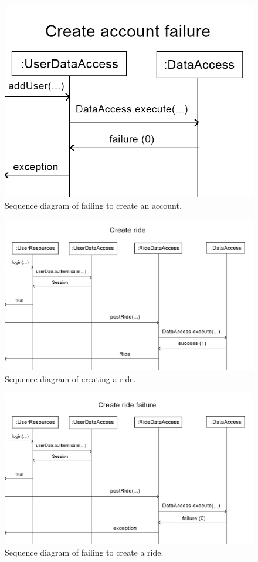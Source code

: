 \documentclass{article}
\begin{document}
\begin{figure}[h]
  \centering
  \includegraphics[scale=0.3]{seqdiagram5.png}
  \caption{Sequence diagram of failing to create an account.}
  \label{fig:seq5}
\end{figure}

\begin{figure}[h]
  \centering
  \includegraphics[scale=0.3]{seqdiagram6.png}
  \caption{Sequence diagram of creating a ride.}
  \label{fig:seq6}
\end{figure}

\begin{figure}[h]
  \centering
  \includegraphics[scale=0.25]{seqdiagram7.png}
  \caption{Sequence diagram of failing to create a ride.}
  \label{fig:seq7}
\end{figure}
\end{document}
